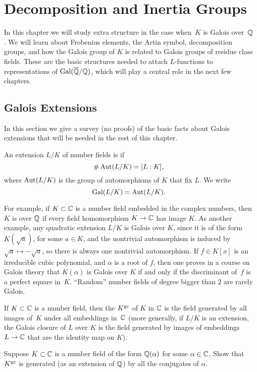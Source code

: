 \chapter{Decomposition and Inertia Groups}

In this chapter we will study extra structure in the case when~$K$
is Galois over~$\mathbb{Q}$. We will learn about Frobenius elements,
the Artin symbol, decomposition groups, and how the Galois group of
$K$ is related to Galois groups of residue class fields. These are
the basic structures needed to attach $L$-functions to representations of
$\operatorname{Gal}(\overline{\mathbb{Q}}/\mathbb{Q})$, which will play a central role in the next few chapters.

\section{Galois Extensions}

In this section we give a survey (no proofs) of the basic facts about
Galois extensions that will be needed in the rest of this chapter.
\begin{definition}[Galois]
	An extension $L/K$ of number fields is  if
	$$
		\#\operatorname{Aut}(L/K) = [L:K],
	$$
	where $\operatorname{Aut}(L/K)$ is the group of automorphisms of $K$
	that fix $L$.  We write
	$$
		\operatorname{Gal}(L/K) = \operatorname{Aut}(L/K).
	$$
\end{definition}
For example, if $K\subset \mathbb{C}$ is a number field embedded in the complex numbers,
then $K$ is  over $\mathbb{Q}$ if every field
homomorphism $K\to \mathbb{C}$ has image $K$. As another example, any quadratic
extension $L/K$ is Galois over $K$, since it is of the form $K(\sqrt{a})$,
for some $a\in K$, and the nontrivial automorphism is induced
by $\sqrt{a}\mapsto -\sqrt{a}$, so there is always one nontrivial automorphism.
If $f\in K[x]$ is an irreducible cubic polynomial, and $\alpha$ is
a root of $f$, then one proves in a course on Galois theory that $K(\alpha)$
is Galois over $K$ if and only if the discriminant of~$f$ is a perfect square
in~$K$. ``Random'' number fields of degree bigger than $2$ are rarely Galois.

If $K\subset \mathbb{C}$ is a number field, then the  $K^{\operatorname{gc}}$
of $K$ in $\mathbb{C}$ is the field generated by all images of~$K$ under all
embeddings in~$\mathbb{C}$ (more generally, if $L/K$ is an extension, the
Galois closure of $L$ over $K$ is the field generated by images of
embeddings $L\to \mathbb{C}$ that are the identity map on $K$).

\begin{exercise}
	Suppose $K \subset \mathbb{C}$ is a number field of the form $\mathbb{Q}(\alpha)$ for some
	$\alpha \in \mathbb{C}$. Show that $K^{\operatorname{gc}}$ is generated (as an extension of $\mathbb{Q}$)
	by all the conjugates of $\alpha$.
\end{exercise}

